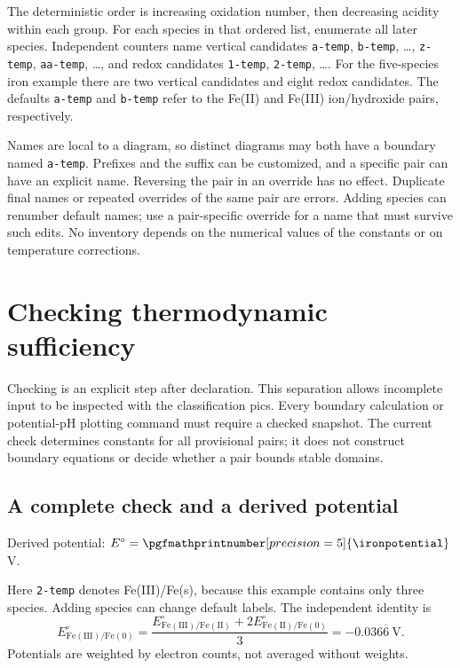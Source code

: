 \documentclass[a4paper,11pt]{ltxdoc}
\begin{document}
The deterministic order is increasing oxidation number, then decreasing acidity
within each group. For each species in that ordered list, enumerate all later
species. Independent counters name vertical candidates
\texttt{a-temp}, \texttt{b-temp}, \ldots, \texttt{z-temp}, \texttt{aa-temp}, \ldots,
and redox candidates \texttt{1-temp}, \texttt{2-temp}, \ldots.
For the five-species iron example there are two vertical candidates and eight
redox candidates. The defaults \texttt{a-temp} and \texttt{b-temp} refer to the
Fe(II) and Fe(III) ion/hydroxide pairs, respectively.

Names are local to a diagram, so distinct diagrams may both have a boundary named
\texttt{a-temp}. Prefixes and the suffix can be customized, and a specific pair
can have an explicit name. Reversing the pair in an override has no effect.
Duplicate final names or repeated overrides of the same pair are errors. Adding
species can renumber default names; use a pair-specific override for a name that
must survive such edits. No inventory depends on the numerical values of the
constants or on temperature corrections.

\section{Checking thermodynamic sufficiency}
\label{sec:thermodynamic-check}
Checking is an explicit step after declaration. This separation allows incomplete
input to be inspected with the classification pics. Every boundary
calculation or potential-pH plotting command must require a checked snapshot.
The current check determines constants for all provisional pairs; it does not
construct boundary equations or decide whether a pair bounds stable domains.

\subsection{A complete check and a derived potential}
\begin{codeexample}[width=0pt]
\checkediron
{}
Derived potential:\space
$E^\circ=\pgfmathprintnumber[precision=5]{\ironpotential}$ V.
\end{codeexample}
Here \texttt{2-temp} denotes Fe(III)/Fe(s), because this example contains only
three species. Adding species can change default labels. The independent identity is
\[
 E^\circ_{\mathrm{Fe(III)/Fe(0)}}
 =\frac{E^\circ_{\mathrm{Fe(III)/Fe(II)}}
       +2E^\circ_{\mathrm{Fe(II)/Fe(0)}}}{3}
 =-0.036\overline{6}\ \mathrm V.
\]
Potentials are weighted by electron counts, not averaged without weights.
\end{document}
